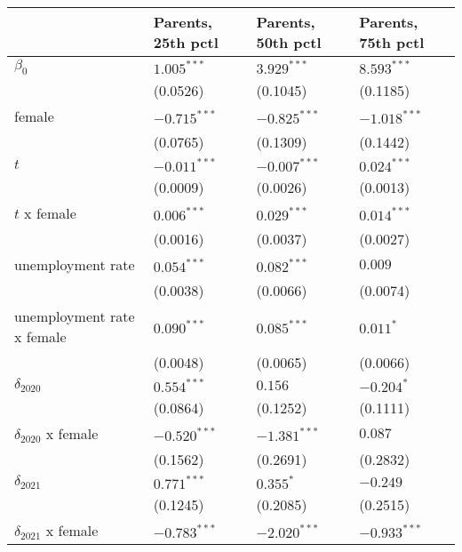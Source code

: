 \begin{tabular}{llll}
\toprule
{} & Parents, 25th pctl & Parents, 50th pctl & Parents, 75th pctl \\
\midrule
$\beta_0$                  &      $1.005^{***}$ &      $3.929^{***}$ &      $8.593^{***}$ \\
                           &           (0.0526) &           (0.1045) &           (0.1185) \\
female                     &     $-0.715^{***}$ &     $-0.825^{***}$ &     $-1.018^{***}$ \\
                           &           (0.0765) &           (0.1309) &           (0.1442) \\
$t$                        &     $-0.011^{***}$ &     $-0.007^{***}$ &      $0.024^{***}$ \\
                           &           (0.0009) &           (0.0026) &           (0.0013) \\
$t$ x female               &      $0.006^{***}$ &      $0.029^{***}$ &      $0.014^{***}$ \\
                           &           (0.0016) &           (0.0037) &           (0.0027) \\
unemployment rate          &      $0.054^{***}$ &      $0.082^{***}$ &            $0.009$ \\
                           &           (0.0038) &           (0.0066) &           (0.0074) \\
unemployment rate x female &      $0.090^{***}$ &      $0.085^{***}$ &          $0.011^*$ \\
                           &           (0.0048) &           (0.0065) &           (0.0066) \\
$\delta_{2020}$            &      $0.554^{***}$ &            $0.156$ &         $-0.204^*$ \\
                           &           (0.0864) &           (0.1252) &           (0.1111) \\
$\delta_{2020}$ x female   &     $-0.520^{***}$ &     $-1.381^{***}$ &            $0.087$ \\
                           &           (0.1562) &           (0.2691) &           (0.2832) \\
$\delta_{2021}$            &      $0.771^{***}$ &          $0.355^*$ &           $-0.249$ \\
                           &           (0.1245) &           (0.2085) &           (0.2515) \\
$\delta_{2021}$ x female   &     $-0.783^{***}$ &     $-2.020^{***}$ &     $-0.933^{***}$ \\

\end{tabular}
